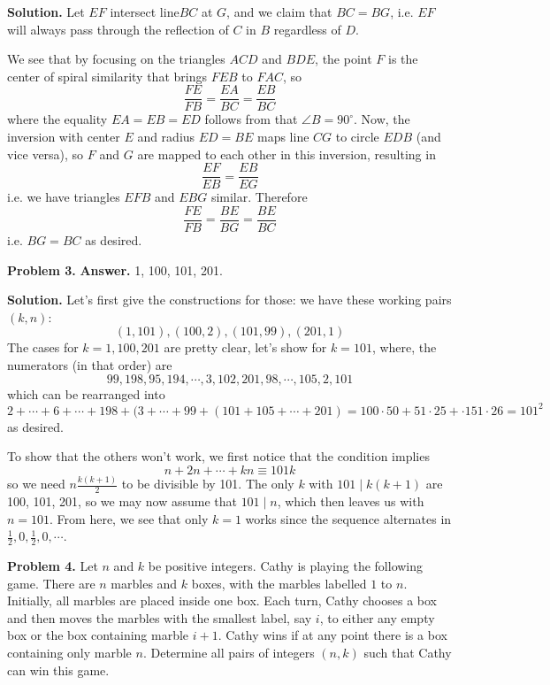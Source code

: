 \documentclass[11pt,a4paper]{article}
\begin{document}
	    \textbf{Solution.} 
	    Let $EF$ intersect line$ BC$ at $G$, and we claim that $BC=BG$, 
	    i.e. $EF$ will always pass through the reflection of $C$ in $B$ regardless of $D$. 
	    
	    We see that by focusing on the triangles $ACD$ and $BDE$, 
	    the point $F$ is the center of spiral similarity that brings $FEB$ to $FAC$, so 
	    \[
	    \frac{FE}{FB}=\frac{EA}{BC}=\frac{EB}{BC}
	    \]
	    where the equality $EA=EB=ED$ follows from that $\angle B=90^{\circ}$. 
	    Now, the inversion with center $E$ and radius $ED=BE$ maps line $CG$ to circle $EDB$ 
	    (and vice versa), so $F$ and $G$ are mapped to each other in this inversion, resulting in 
	    \[
	    \frac{EF}{EB} = \frac{EB}{EG}
	    \]
	    i.e. we have triangles $EFB$ and $EBG$ similar. Therefore 
	    \[
	    \frac{FE}{FB}=\frac{BE}{BG}=\frac{BE}{BC}
	    \]
	    i.e. $BG=BC$ as desired. 
	    
	    \textbf{Problem 3.} 
	    \textbf{Answer.} 
	    1, 100, 101, 201. 
	    
	    \textbf{Solution.} 
	    Let's first give the constructions for those: we have these working pairs $(k, n)$: 
	    \[
	    (1, 101), (100, 2), (101, 99), (201, 1)
	    \]
	    The cases for $k=1, 100, 201$ are pretty clear, let's show for $k=101$, where, the numerators (in that order) are 
	    \[
	    99,198,95,194,\cdots, 3, 102, 201, 98, \cdots, 105, 2, 101
	    \]
	    which can be rearranged into 
	    \[
	    2+\cdots + 6 + \cdots +198+(3+\cdots + 99 + (101+105+\cdots + 201)
	    =100\cdot 50+51\cdot 25+\cdot 151\cdot 26
	    =101^2
	    \]
	    as desired. 
	    
	    To show that the others won't work, we first notice that the condition implies 
	    \[
	    n+2n+\cdots + kn\equiv 101k
	    \]
	    so we need $n\frac{k(k+1)}{2}$ to be divisible by 101. 
	    The only $k$ with $101\mid k(k+1)$ are 100, 101, 201, so 
	    we may now assume that $101\mid n$, 
	    which then leaves us with $n=101$. 
	    From here, we see that only $k=1$ works since the sequence alternates in $\frac 12, 0, \frac 12, 0, \cdots$. 
	    
	    \textbf{Problem 4.}
	    Let $n$ and $k$ be positive integers. Cathy is playing the following game. There are $n$ marbles and $k$ boxes, with the marbles labelled $1$ to $n$. Initially, all marbles are placed inside one box. Each turn, Cathy chooses a box and then moves the marbles with the smallest label, say $i$, to either any empty box or the box containing marble $i+1$. Cathy wins if at any point there is a box containing only marble $n$.
	    Determine all pairs of integers $(n,k)$ such that Cathy can win this game.
	    
\end{document}
